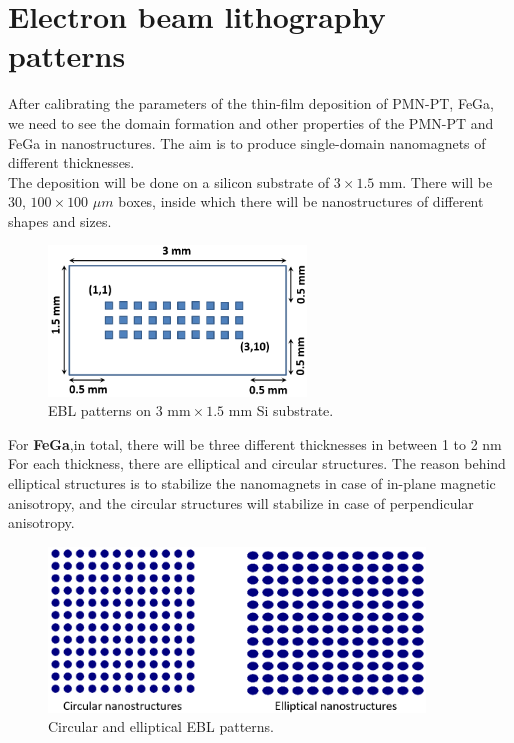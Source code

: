 \documentclass[12pt,a4paper,bold]{thesis}
\theoremstyle{thm}
\theoremstyle{definition}
\begin{document}
\section{Electron beam lithography patterns}
\indent\indent\indent After calibrating the parameters of the thin-film deposition of PMN-PT, FeGa, we need to see the domain formation and other properties of the PMN-PT and FeGa in nanostructures. The aim is to produce single-domain nanomagnets of different thicknesses.\\
The deposition will be done on a silicon substrate of $3\times 1.5 \text{ mm}$. There will be 30, $100 \times 100 $ $\mu m$ boxes, inside which there will be nanostructures of different shapes and sizes.
\begin{figure}[H]
	\centering
   \includegraphics[height=4cm]{Images/69.png} 
   \caption{EBL patterns on $3\text{ mm} \times 1.5$ mm Si substrate.}
\end{figure}
For \textbf{FeGa},in total, there will be three different thicknesses in between 1 to 2 nm\\
For each thickness, there are elliptical and circular structures. The reason behind elliptical structures is to stabilize the nanomagnets in case of in-plane magnetic anisotropy, and the circular structures will stabilize in case of perpendicular anisotropy.
\begin{figure}[H]
	\centering
   \includegraphics[width=10cm]{Images/68.png} 
   \caption{Circular and elliptical EBL patterns.}
\end{figure}  
\end{document}
